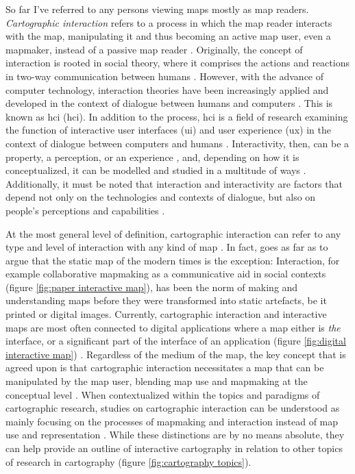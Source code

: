 So far I've referred to any persons viewing maps mostly as map readers.
\textit{Cartographic interaction} refers to a process
in which the map reader interacts with the map,
manipulating it and thus becoming an active map user, even a mapmaker,
instead of a passive map reader \parencite{rot2017}.
Originally, the concept of interaction is rooted in social theory,
where it comprises the actions and reactions in
two-way communication between humans \parencite{ken1996}.
However, with the advance of computer technology,
interaction theories have been increasingly applied and developed
in the context of dialogue between humans and computers \parencite{qui2008}.
This is known as \acrlong{hci} (\acrshort{hci}).
In addition to the process, \acrshort{hci} is a field of research examining
the function of interactive user interfaces (\acrshort{ui})
and user experience (\acrshort{ux})
in the context of dialogue between computers and humans \parencite{car1997, hor2017}.
Interactivity, then, can be
a property, a perception, or an experience \parencite{lan2023},
and, depending on how it is conceptualized,
it can be modelled and studied in a multitude of ways \parencite{smu2009}.
Additionally, it must be noted that interaction and interactivity are factors
that depend not only on the technologies and
contexts of dialogue, but also on people’s perceptions and capabilities
\parencite{kio2002, duc2018}.

At the most general level of definition,
cartographic interaction can refer to
any type and level of interaction with any kind of map \parencite{pet1998}.
In fact, \citeauthor{pet1998} goes as far as to argue
that the static map of the modern times is the exception:
Interaction, for example collaborative mapmaking
as a communicative aid in social contexts
(figure \ref{fig:paper interactive map}),
has been the norm of making and understanding maps
before they were transformed into static artefacts,
be it printed or digital images.
Currently, cartographic interaction and interactive maps
are most often connected to digital applications
where a map either is \textit{the} interface,
or a significant part of the interface of an application
(figure \ref{fig:digital interactive map}) \parencite{mei2019}.
Regardless of the medium of the map,
the key concept that is agreed upon is that cartographic interaction necessitates
a map that can be manipulated by the map user,
blending map use and mapmaking at the conceptual level \parencite{rot2015}.
When contextualized within the topics and paradigms of cartographic research,
studies on cartographic interaction can be understood as
mainly focusing on the processes of mapmaking and interaction
instead of map use and representation \parencite{rot2013b}.
While these distinctions are by no means absolute,
they can help provide an outline of interactive cartography in
relation to other topics of research in cartography (figure \ref{fig:cartography topics}).

